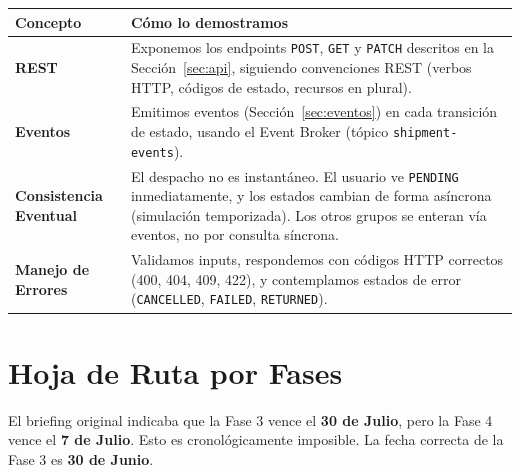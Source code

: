 \documentclass[11pt, a4paper]{article}
\begin{document}
\begin{table}[h!]
\centering
\renewcommand{\arraystretch}{1.4}
\begin{tabularx}{\textwidth}{l X}
  \toprule
  \textbf{Concepto} & \textbf{Cómo lo demostramos} \\
  \midrule
  \textbf{REST} &
    Exponemos los endpoints \texttt{POST}, \texttt{GET} y \texttt{PATCH} descritos
    en la Sección~\ref{sec:api}, siguiendo convenciones REST (verbos HTTP, códigos
    de estado, recursos en plural). \\
  \textbf{Eventos} &
    Emitimos eventos (Sección~\ref{sec:eventos}) en cada transición de estado,
    usando el Event Broker (tópico \texttt{shipment-events}). \\
  \textbf{Consistencia Eventual} &
    El despacho no es instantáneo. El usuario ve \texttt{PENDING} inmediatamente,
    y los estados cambian de forma asíncrona (simulación temporizada). Los otros
    grupos se enteran vía eventos, no por consulta síncrona. \\
  \textbf{Manejo de Errores} &
    Validamos inputs, respondemos con códigos HTTP correctos (400, 404, 409, 422),
    y contemplamos estados de error (\texttt{CANCELLED}, \texttt{FAILED},
    \texttt{RETURNED}). \\
  \bottomrule
\end{tabularx}
\end{table}


\section{Hoja de Ruta por Fases}

\begin{alertbox}[title={\faExclamationTriangle\quad Corrección crítica: Fecha de Fase 3}]
  El briefing original indicaba que la Fase 3 vence el \textbf{30 de Julio},
  pero la Fase 4 vence el \textbf{7 de Julio}. Esto es cronológicamente
  imposible. La fecha correcta de la Fase 3 es \textbf{30 de Junio}.
\end{alertbox}
\end{document}
